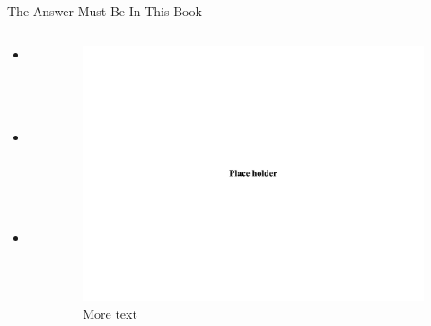 \documentclass[
  ignorenonframetext,
]{beamer}
\providecommand{\tightlist}{%
  \setlength{\itemsep}{0pt}\setlength{\parskip}{0pt}}
\begin{document}
\begin{frame}{The Answer Must Be In This Book}
\protect\hypertarget{the-answer-must-be-in-this-book}{}
\begin{columns}[T]
\begin{column}{0.5\textwidth}
\begin{itemize}
\tightlist
\item
  Text
\item
  Text.
\item
  Text.
\end{itemize}
\end{column}

\begin{column}{0.5\textwidth}
\begin{figure}
\centering
\includegraphics{./images/placeholder.jpg}
\caption{More text}
\end{figure}
\end{column}
\end{columns}
\end{frame}
\end{document}
